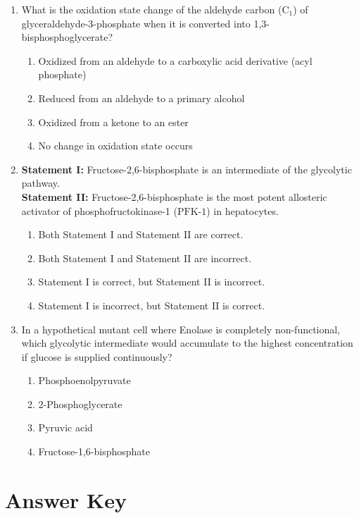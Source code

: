 \documentclass[11pt, a4paper]{article}
\begin{document}
\begin{enumerate}[label=\textbf{\arabic*.}]
\item What is the oxidation state change of the aldehyde carbon ($\text{C}_1$) of glyceraldehyde-3-phosphate when it is converted into 1,3-bisphosphoglycerate?
\begin{enumerate}[label=(\Alph*)]
    \item Oxidized from an aldehyde to a carboxylic acid derivative (acyl phosphate)
    \item Reduced from an aldehyde to a primary alcohol
    \item Oxidized from a ketone to an ester
    \item No change in oxidation state occurs
\end{enumerate}

\item \textbf{Statement I:} Fructose-2,6-bisphosphate is an intermediate of the glycolytic pathway. \\
\textbf{Statement II:} Fructose-2,6-bisphosphate is the most potent allosteric activator of phosphofructokinase-1 ($\text{PFK-1}$) in hepatocytes.
\begin{enumerate}[label=(\Alph*)]
    \item Both Statement I and Statement II are correct.
    \item Both Statement I and Statement II are incorrect.
    \item Statement I is correct, but Statement II is incorrect.
    \item Statement I is incorrect, but Statement II is correct.
\end{enumerate}

\item In a hypothetical mutant cell where Enolase is completely non-functional, which glycolytic intermediate would accumulate to the highest concentration if glucose is supplied continuously?
\begin{enumerate}[label=(\Alph*)]
    \item Phosphoenolpyruvate
    \item 2-Phosphoglycerate
    \item Pyruvic acid
    \item Fructose-1,6-bisphosphate
\end{enumerate}

\end{enumerate}

\newpage

\section*{Answer Key}
\end{document}
